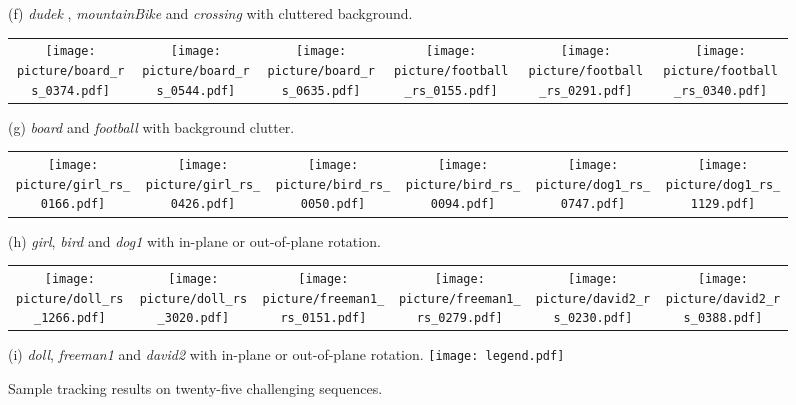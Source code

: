 \documentclass[preprint,12pt,review]{elsarticle}
\begin{document}
\begin{figure*}[tbp]
(f) \emph{dudek} , \emph{mountainBike} and \emph{crossing} with cluttered background.
\begin{tabular}{c@{}c@{}c@{}c@{}c@{}c}
\texttt{[image: picture/board\_rs\_0374.pdf]}
&
\texttt{[image: picture/board\_rs\_0544.pdf]}
&
\texttt{[image: picture/board\_rs\_0635.pdf]}
&
\texttt{[image: picture/football\_rs\_0155.pdf]}
&
\texttt{[image: picture/football\_rs\_0291.pdf]}
&
\texttt{[image: picture/football\_rs\_0340.pdf]}
\\
\end{tabular}

(g) \emph{board} and \emph{football}  with background clutter.
\begin{tabular}{c@{}c@{}c@{}c@{}c@{}c}
\texttt{[image: picture/girl\_rs\_0166.pdf]}
&
\texttt{[image: picture/girl\_rs\_0426.pdf]}
&
\texttt{[image: picture/bird\_rs\_0050.pdf]}
&
\texttt{[image: picture/bird\_rs\_0094.pdf]}
&
\texttt{[image: picture/dog1\_rs\_0747.pdf]}
&
\texttt{[image: picture/dog1\_rs\_1129.pdf]}
\\
\end{tabular}

(h) \emph{girl}, \emph{bird} and \emph{dog1}  with in-plane or out-of-plane rotation.
\begin{tabular}{c@{}c@{}c@{}c@{}c@{}c}
\texttt{[image: picture/doll\_rs\_1266.pdf]}
&
\texttt{[image: picture/doll\_rs\_3020.pdf]}
&
\texttt{[image: picture/freeman1\_rs\_0151.pdf]}
&
\texttt{[image: picture/freeman1\_rs\_0279.pdf]}
&
\texttt{[image: picture/david2\_rs\_0230.pdf]}
&
\texttt{[image: picture/david2\_rs\_0388.pdf]}
\\
\end{tabular}

(i) \emph{doll}, \emph{freeman1} and \emph{david2}  with in-plane or out-of-plane rotation.
\texttt{[image: legend.pdf]}
\caption{Sample tracking results on twenty-five challenging sequences.}
\label{fig:trackingresults}
\end{figure*}
\end{document}
